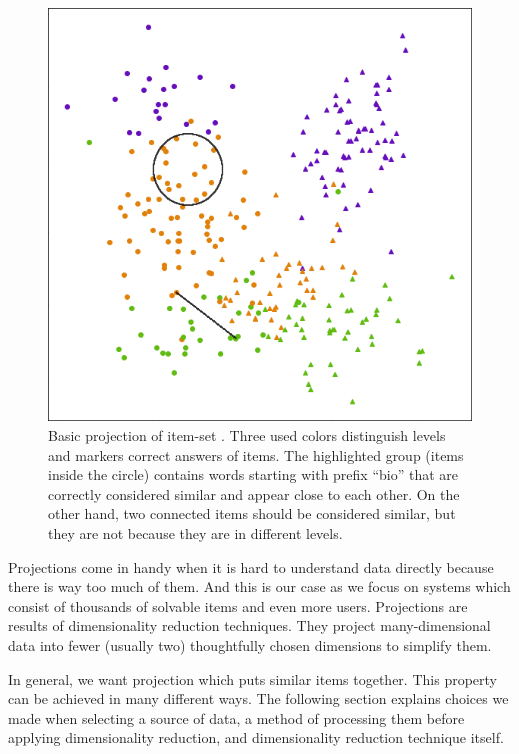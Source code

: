 \documentclass[
  print, %
  table,   %
  nolof,     %
  nolot,     %
  nocover,
  color,
  final,
]{fithesis3}
\begin{document}
\begin{figure}
    \includegraphics[width=\textwidth]{img/common_projection}
  \caption{Basic projection of item-set \cviceniB{}. Three used colors distinguish levels and markers correct answers of items. The highlighted group (items inside the circle) contains words starting with prefix ``bio'' that are correctly considered similar and appear close to each other. On the other hand, two connected items should be considered similar, but they are not because they are in different levels.}
  \label{fig:common_projection}
\end{figure}


Projections come in handy when it is hard to understand data directly because there is way too much of them. And this is our case as we focus on systems which consist of thousands of solvable items and even more users. Projections are results of dimensionality reduction techniques. They project many-dimensional data into fewer (usually two) thoughtfully chosen dimensions to simplify them.


In general, we want projection which puts similar items together. This property can be achieved in many different ways. The following section explains choices we made when selecting a source of data, a method of processing them before applying dimensionality reduction, and dimensionality reduction technique itself.
\end{document}
